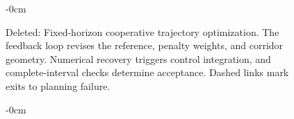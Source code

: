 \documentclass[electronics,article,submit,moreauthors]{Definitions/mdpi}
\providecommand{\DIFaddbegin}{}\providecommand{\DIFaddend}{} %
\begin{document}
\begin{figure}[htbp]
\begin{adjustwidth}{-\extralength}{0cm}
\begin{mdframed}[linecolor=RevisionRed,linewidth=.65pt,innerleftmargin=2pt,innerrightmargin=2pt,innertopmargin=3pt,innerbottommargin=3pt]
{}
\caption*{\textcolor{RevisionRed}{Deleted:} Fixed-horizon cooperative trajectory optimization. The feedback loop revises the reference, penalty weights, and corridor geometry. Numerical recovery triggers control integration, and complete-interval checks determine acceptance. Dashed links mark exits to planning failure.}
\end{mdframed}
\end{adjustwidth}
\end{figure}

\DIFdelend \DIFaddbegin \begin{figure}[htbp]
\begin{adjustwidth}{-\extralength}{0cm}
\begin{mdframed}[linecolor=RevisionBlue,linewidth=.65pt,innerleftmargin=2pt,innerrightmargin=2pt,innertopmargin=3pt,innerbottommargin=3pt]
\color{RevisionBlue}
\setlength{\textwidth}{\linewidth}\setlength{\fulllength}{\linewidth}


\end{mdframed}
\end{adjustwidth}
\end{figure}
\end{document}
